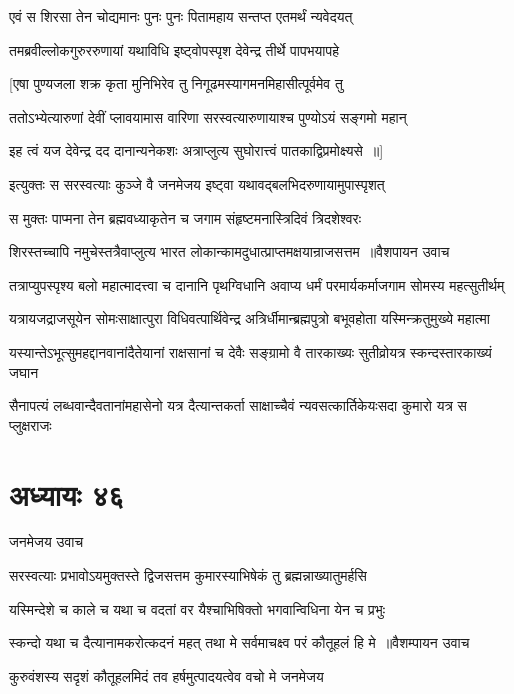 \twolineshloka
{एवं स शिरसा तेन चोद्यमानः पुनः पुनः}
{पितामहाय सन्तप्त एतमर्थं न्यवेदयत्}


\twolineshloka
{तमब्रवील्लोकगुरुररुणायां यथाविधि}
{इष्ट्वोपस्पृश देवेन्द्र तीर्थे पापभयापहे}


\twolineshloka
{[एषा पुण्यजला शक्र कृता मुनिभिरेव तु}
{निगूढमस्यागमनमिहासीत्पूर्वमेव तु}


\twolineshloka
{ततोऽभ्येत्यारुणां देवीं प्लावयामास वारिणा}
{सरस्वत्यारुणायाश्च पुण्योऽयं सङ्गमो महान्}


\twolineshloka
{इह त्वं यज देवेन्द्र दद दानान्यनेकशः}
{अत्राप्लुत्य सुघोरात्त्वं पातकाद्विप्रमोक्ष्यसे ॥]}


\twolineshloka
{इत्युक्तः स सरस्वत्याः कुञ्जे वै जनमेजय}
{इष्ट्वा यथावद्बलभिदरुणायामुपास्पृशत्}


\twolineshloka
{स मुक्तः पाप्मना तेन ब्रह्मवध्याकृतेन च}
{जगाम संहृष्टमनास्त्रिदिवं त्रिदशेश्वरः}


\threelineshloka
{शिरस्तच्चापि नमुचेस्तत्रैवाप्लुत्य भारत}
{लोकान्कामदुधात्प्राप्तमक्षयान्राजसत्तम ॥वैशपायन उवाच}
{}


\twolineshloka
{तत्राप्युपस्पृश्य बलो महात्मादत्त्वा च दानानि पृथग्विधानि}
{अवाप्य धर्मं परमार्यकर्माजगाम सोमस्य महत्सुतीर्थम्}


\twolineshloka
{यत्रायजद्राजसूयेन सोमःसाक्षात्पुरा विधिवत्पार्थिवेन्द्र}
{अत्रिर्धीमान्ब्रह्मपुत्रो बभूवहोता यस्मिन्क्रतुमुख्ये महात्मा}


\twolineshloka
{यस्यान्तेऽभूत्सुमहद्दानवानांदैतेयानां राक्षसानां च देवैः}
{सङ्ग्रामो वै तारकाख्यः सुतीव्रोयत्र स्कन्दस्तारकाख्यं जघान}


\twolineshloka
{सैनापत्यं लब्धवान्दैवतानांमहासेनो यत्र दैत्यान्तकर्ता}
{साक्षाच्चैवं न्यवसत्कार्तिकेयःसदा कुमारो यत्र स प्लुक्षराजः}


\chapter{अध्यायः ४६}
\twolineshloka
{जनमेजय उवाच}
{}


\twolineshloka
{सरस्वत्याः प्रभावोऽयमुक्तस्ते द्विजसत्तम}
{कुमारस्याभिषेकं तु ब्रह्मन्नाख्यातुमर्हसि}


\twolineshloka
{यस्मिन्देशे च काले च यथा च वदतां वर}
{यैश्चाभिषिक्तो भगवान्विधिना येन च प्रभुः}


\threelineshloka
{स्कन्दो यथा च दैत्यानामकरोत्कदनं महत्}
{तथा मे सर्वमाचक्ष्व परं कौतूहलं हि मे ॥वैशम्पायन उवाच}
{}


\twolineshloka
{कुरुवंशस्य सदृशं कौतूहलमिदं तव}
{हर्षमुत्पादयत्वेव वचो मे जनमेजय}


